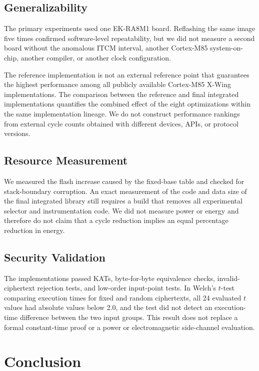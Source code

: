 \documentclass[runningheads,orivec]{llncs}
\newcommand{\xwing}{X-Wing}
\begin{document}
\subsection{Generalizability}

The primary experiments used one EK-RA8M1 board. Reflashing the same image five
times confirmed software-level repeatability, but we did not measure a second
board without the anomalous ITCM interval, another Cortex-M85 system-on-chip,
another compiler, or another clock configuration.

The reference implementation is not an external reference point that guarantees
the highest performance among all publicly available Cortex-M85 \xwing{}
implementations. The comparison between the reference and final integrated
implementations quantifies the combined effect of the eight optimizations within
the same implementation lineage. We do not construct performance rankings from
external cycle counts obtained with different devices, APIs, or protocol
versions.

\subsection{Resource Measurement}

We measured the flash increase caused by the fixed-base table and checked for
stack-boundary corruption. An exact measurement of the code and data size of
the final integrated library still requires a build that removes all
experimental selector and instrumentation code. We did not measure power or
energy and therefore do not claim that a cycle reduction implies an equal
percentage reduction in energy.

\subsection{Security Validation}

The implementations passed KATs, byte-for-byte equivalence checks, invalid-
ciphertext rejection tests, and low-order input-point tests. In Welch's $t$-test
comparing execution times for fixed and random ciphertexts, all 24 evaluated
$t$ values had absolute values below 2.0, and the test did not detect an
execution-time difference between the two input groups. This result does not
replace a formal constant-time proof or a power or electromagnetic side-channel
evaluation.

\section{Conclusion}\label{sec:conclusion}
\end{document}
